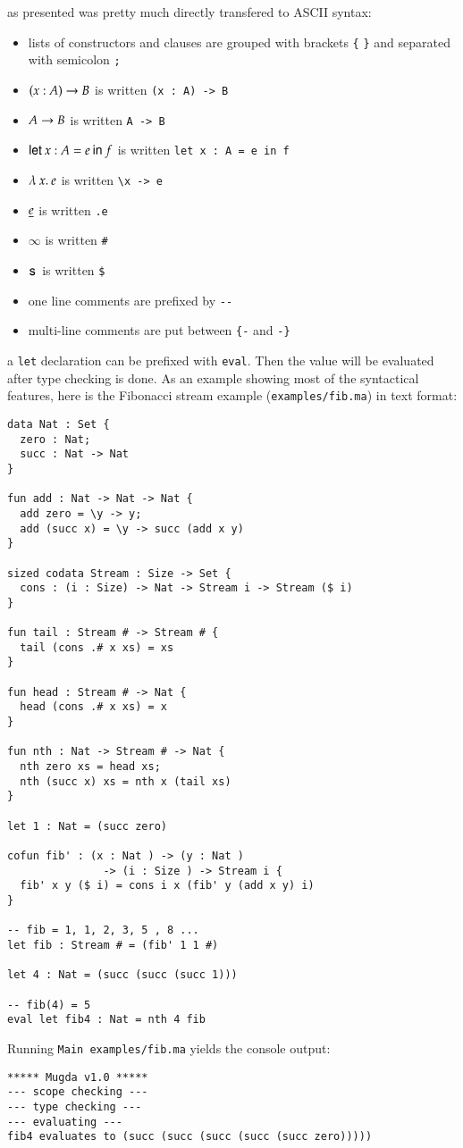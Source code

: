 \mugda as presented was pretty much directly transfered to ASCII syntax:
\begin{itemize}
\item
lists of constructors and clauses are grouped with brackets \texttt{\{} \texttt{\}} and separated with semicolon \texttt{;}
\item
$( x : A ) \rightarrow{B}$ is written \texttt{(x : A) -> B }
\item
$A \rightarrow B$ is written \texttt{A -> B}
\item
$\mathsf{let}\: x : A = e \: \mathsf{in}\:{f}$ is written \texttt{let x : A = e in f}
\item
$ \lambda\: x .\:e$ is written \verb+\x -> e +
\item
$ \underline{e}$ is written \texttt{.e}
\item
$ \infty$ is written \texttt{\#}
\item
$\mathsf{s}\,$ is written \texttt{\$}
\item
one line comments are prefixed by \verb+--+
\item
multi-line comments are put between \verb+{-+ and \verb+-}+
\end{itemize}
a \texttt{let} declaration can be prefixed with \texttt{eval}. Then the value will be evaluated after type checking is done.
As an example showing most of the syntactical features, here is the Fibonacci stream example (\texttt{examples/fib.ma}) in text format:
\begin{verbatim}
data Nat : Set {
  zero : Nat;
  succ : Nat -> Nat
}

fun add : Nat -> Nat -> Nat {
  add zero = \y -> y;
  add (succ x) = \y -> succ (add x y)
}

sized codata Stream : Size -> Set {
  cons : (i : Size) -> Nat -> Stream i -> Stream ($ i)
}

fun tail : Stream # -> Stream # {
  tail (cons .# x xs) = xs
}

fun head : Stream # -> Nat {
  head (cons .# x xs) = x
}

fun nth : Nat -> Stream # -> Nat {
  nth zero xs = head xs;
  nth (succ x) xs = nth x (tail xs)
}

let 1 : Nat = (succ zero)

cofun fib' : (x : Nat ) -> (y : Nat )
               -> (i : Size ) -> Stream i {
  fib' x y ($ i) = cons i x (fib' y (add x y) i)
}

-- fib = 1, 1, 2, 3, 5 , 8 ...
let fib : Stream # = (fib' 1 1 #)

let 4 : Nat = (succ (succ (succ 1)))

-- fib(4) = 5
eval let fib4 : Nat = nth 4 fib
\end{verbatim}
Running \texttt{Main examples/fib.ma} yields the console output:
\begin{verbatim}
***** Mugda v1.0 *****
--- scope checking ---
--- type checking ---
--- evaluating ---
fib4 evaluates to (succ (succ (succ (succ (succ zero)))))
\end{verbatim}

